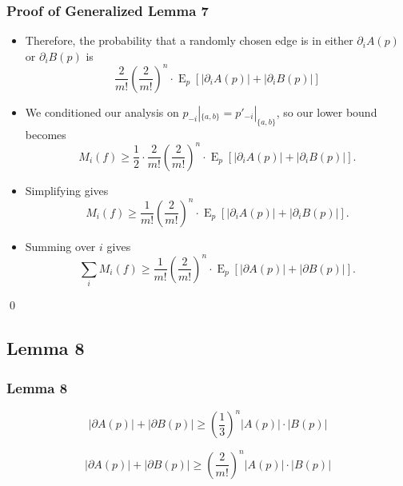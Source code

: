 \documentclass[aspectratio=169]{beamer}
\DeclareMathOperator{\expectedvalue}{E}
\begin{document}
		\begin{frame}
			\frametitle{Proof of Generalized Lemma 7}

			\begin{itemize}
				\item Therefore, the probability that a randomly chosen edge is in either $\partial_i A(p)$ or $\partial_i B(p)$ is
					\[
						\frac{2}{m!} \left(\frac{2}{m!}\right)^{n} \cdot \expectedvalue_p \left[ |\partial_i A(p)| + |\partial_i B(p)| \right]
					\]
				\item We conditioned our analysis on $p_{-i}|_{\{a,b\}} = p'_{-i}|_{\{a,b\}}$, so our lower bound becomes
					\[
						M_i(f) \ge \frac{1}{2} \cdot \frac{2}{m!}\left(\frac{2}{m!}\right)^{n} \cdot \expectedvalue_p \left[ |\partial_i A(p)| + |\partial_i B(p)| \right].
					\]
				\item Simplifying gives
					\[
						M_i(f) \ge \frac{1}{m!}\left(\frac{2}{m!}\right)^{n} \cdot \expectedvalue_p \left[ |\partial_i A(p)| + |\partial_i B(p)| \right].
					\]
				\item Summing over $i$ gives
					\[
						\sum_i M_i(f) \ge \frac{1}{m!}\left(\frac{2}{m!}\right)^{n} \cdot \expectedvalue_p \left[ |\partial A(p)| + |\partial B(p)| \right].
					\]
			\end{itemize}

			\qed
		\end{frame}


	\subsection{Lemma 8}

		\begin{frame}
			\frametitle{Lemma 8}

			\begin{lemma}
				\[
					|\partial A(p)| + |\partial B(p)| \ge \left( \frac{1}{3} \right)^n |A(p)| \cdot |B(p)|
				\]
			\end{lemma}

			\begin{lemma}
				\[
					|\partial A(p)| + |\partial B(p)| \ge \left( \frac{2}{m!} \right)^n |A(p)| \cdot |B(p)|
				\]
			\end{lemma}

		\end{frame}
\end{document}
